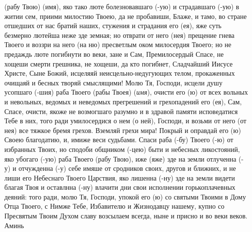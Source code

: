 \begin{mymulticols}
(рабу Твою) (имя), яко тако люте болезновавшаго (-ую) и страдавшаго (-ую) в житии сем, приими милостию Твоею, да не пробавиши, Блаже, и тамо, во стране отшедших от нас братий наших, стужения и страдания его (ея), яже суть безмерно лютейша неже зде земная; но отврати от него (нея) прещение гнева Твоего и воззри на него (на ню) пресветлым оком милосердия Твоего; но не предаждь люте погибнути во веки, зане и Сам, Премилосердый Спасе, не хощеши смерти грешника, не хощеши, да кто погибнет, Сладчайший Иисусе Христе, Сыне Божий, исцеляяй неисцельно-недугующих телом, прокаженных очищаяй и бесных творяй смыслящими! Молю Тя, Господи, исцели душу усопшаго (-шия) раба Твоего (рабы Твоея) ({\itshape имя}), очисти его (ю) от всех вольных и невольных, ведомых и неведомых прегрешений и грехопадений его (ея), Сам, Спасе, очисти, якоже не возмогшаго разумно и в здравой памяти исповедатися Тебе в них, того ради умилосердися о нем (о ней), Господи, и возьми от него (от нея) все тяжкое бремя грехов. Вземляй грехи мира! Покрый и оправдай его (ю) Своею благодатию, и, имиже веси судьбами. Спаси раба (-бу) Твоего (-ю) от избранных Твоих, но сподоби общником (-цею) быти и небесных ликостояний, яко убогаго (-ую) раба Твоего (рабу Твою), иже (яже) зде на земли отлученна (-у) и отчужденна (-у) себе имяше от сродников своих, другов и ближних, и не лиши его Небеснаго Твоего Царствия, яко лишенна (-ну) зде на земли видети благая Твоя и оставлнна (-ну) влачити дни свои исполнении горькоплачевных деяний: того ради, молю Тя, Господи, упокой его (ю) со святыми Твоими в Дому Отца Твоего, с Нимже Тебе, Избавителю и Жизнодавцу нашему, купно со Пресвятым Твоим Духом славу возсылаем всегда, ныне и присно и во веки веков. Аминь

\end{mymulticols}

\mychapterending


